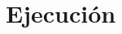 \documentclass[12pt,a4paper]{article}
\begin{document}
%
%



%		
%		
%		
%		
		
	\section{Ejecución}\label{sec:ejecucion}
		
%		
%		
%		
\newpage
\end{document}
